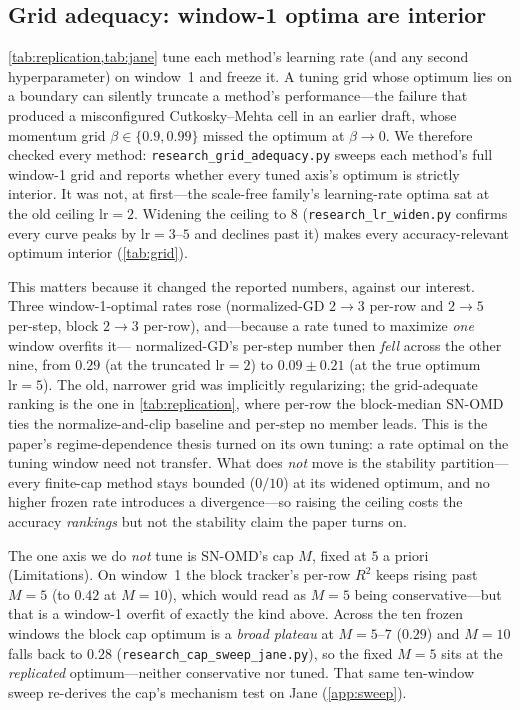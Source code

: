 \documentclass{article}
\begin{document}
\subsection{Grid adequacy: window-1 optima are interior}
\label{app:grid}

\cref{tab:replication,tab:jane} tune each method's learning rate (and any second
hyperparameter) on window~1 and freeze it. A tuning grid whose optimum lies on a boundary can
silently truncate a method's performance---the failure that produced a misconfigured
Cutkosky--Mehta cell in an earlier draft, whose momentum grid $\beta\in\{0.9,0.99\}$ missed the
optimum at $\beta\!\to\!0$. We therefore checked every method:
\texttt{research\_grid\_adequacy.py} sweeps each method's full window-1 grid and reports whether
every tuned axis's optimum is strictly interior. It was not, at first---the scale-free family's
learning-rate optima sat at the old ceiling $\mathrm{lr}{=}2$. Widening the ceiling to $8$
(\texttt{research\_lr\_widen.py} confirms every curve peaks by $\mathrm{lr}{=}3$--$5$ and
declines past it) makes every accuracy-relevant optimum interior (\cref{tab:grid}).

This matters because it changed the reported numbers, against our interest. Three
window-1-optimal rates rose (normalized-GD $2\!\to\!3$ per-row and $2\!\to\!5$ per-step, block
$2\!\to\!3$ per-row), and---because a rate tuned to maximize \emph{one} window overfits it---%
normalized-GD's per-step number then \emph{fell} across the other nine, from $0.29$ (at the
truncated $\mathrm{lr}{=}2$) to $0.09\!\pm\!0.21$ (at the true optimum $\mathrm{lr}{=}5$). The
old, narrower grid was implicitly regularizing; the grid-adequate ranking is the one in
\cref{tab:replication}, where per-row the block-median SN-OMD ties the normalize-and-clip
baseline and per-step no member leads. This is the paper's regime-dependence thesis turned on
its own tuning: a rate optimal on the tuning window need not transfer. What does \emph{not}
move is the stability partition---every finite-cap method stays bounded ($0/10$) at its widened
optimum, and no higher frozen rate introduces a divergence---so raising the ceiling costs the
accuracy \emph{rankings} but not the stability claim the paper turns on.

The one axis we do \emph{not} tune is SN-OMD's cap $M$, fixed at $5$ a priori (Limitations). On
window~1 the block tracker's per-row $R^2$ keeps rising past $M{=}5$ (to $0.42$ at $M{=}10$),
which would read as $M{=}5$ being conservative---but that is a window-1 overfit of exactly the
kind above. Across the ten frozen windows the block cap optimum is a \emph{broad plateau} at
$M{=}5$--$7$ ($0.29$) and $M{=}10$ falls back to $0.28$
(\texttt{research\_cap\_sweep\_jane.py}), so the fixed $M{=}5$ sits at the \emph{replicated}
optimum---neither conservative nor tuned. That same ten-window sweep re-derives the cap's
mechanism test on Jane (\cref{app:sweep}).
\end{document}
